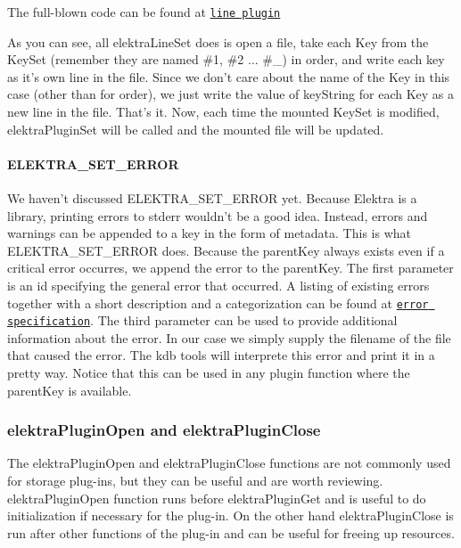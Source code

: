 The full-\/blown code can be found at \href{http://libelektra.org/tree/master/src/plugins/line/line.c}{\tt line plugin}

As you can see, all {\ttfamily elektra\+Line\+Set} does is open a file, take each Key from the Key\+Set (remember they are named {\ttfamily \#1}, {\ttfamily \#2} ... {\ttfamily \#\+\_}) in order, and write each key as it's own line in the file. Since we don't care about the name of the Key in this case (other than for order), we just write the value of {\ttfamily key\+String} for each Key as a new line in the file. That's it. Now, each time the mounted Key\+Set is modified, {\ttfamily elektra\+Plugin\+Set} will be called and the mounted file will be updated.

\paragraph*{E\+L\+E\+K\+T\+R\+A\+\_\+\+S\+E\+T\+\_\+\+E\+R\+R\+O\+R}

We haven't discussed {\ttfamily E\+L\+E\+K\+T\+R\+A\+\_\+\+S\+E\+T\+\_\+\+E\+R\+R\+O\+R} yet. Because Elektra is a library, printing errors to stderr wouldn't be a good idea. Instead, errors and warnings can be appended to a key in the form of metadata. This is what {\ttfamily E\+L\+E\+K\+T\+R\+A\+\_\+\+S\+E\+T\+\_\+\+E\+R\+R\+O\+R} does. Because the parent\+Key always exists even if a critical error occurres, we append the error to the {\ttfamily parent\+Key}. The first parameter is an id specifying the general error that occurred. A listing of existing errors together with a short description and a categorization can be found at \href{https://github.com/ElektraInitiative/libelektra/blob/master/src/error/specification}{\tt error specification}. The third parameter can be used to provide additional information about the error. In our case we simply supply the filename of the file that caused the error. The kdb tools will interprete this error and print it in a pretty way. Notice that this can be used in any plugin function where the parent\+Key is available.

\subsubsection*{elektra\+Plugin\+Open and elektra\+Plugin\+Close}

The {\ttfamily elektra\+Plugin\+Open} and {\ttfamily elektra\+Plugin\+Close} functions are not commonly used for storage plug-\/ins, but they can be useful and are worth reviewing. {\ttfamily elektra\+Plugin\+Open} function runs before {\ttfamily elektra\+Plugin\+Get} and is useful to do initialization if necessary for the plug-\/in. On the other hand {\ttfamily elektra\+Plugin\+Close} is run after other functions of the plug-\/in and can be useful for freeing up resources.

